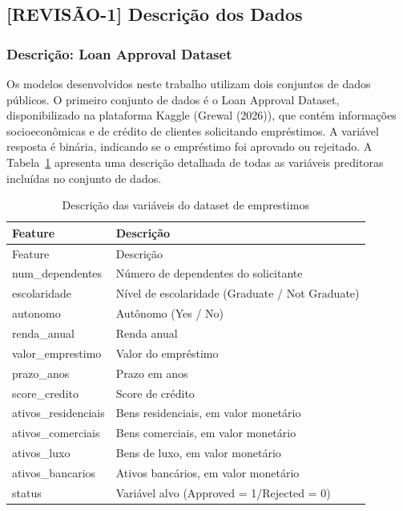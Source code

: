 \documentclass[
  brazilian,
  12pt,
  letterpaper,
  DIV=11,
  numbers=noendperiod]{scrartcl}
\begin{document}
\subsection{{[}REVISÃO-1{]} Descrição dos
Dados}\label{revisuxe3o-1-descriuxe7uxe3o-dos-dados}

\subsubsection{Descrição: Loan Approval
Dataset}\label{descriuxe7uxe3o-loan-approval-dataset}

Os modelos desenvolvidos neste trabalho utilizam dois conjuntos de dados
públicos. O primeiro conjunto de dados é o Loan Approval Dataset,
disponibilizado na plataforma Kaggle (Grewal (2026)), que contém
informações socioeconômicas e de crédito de clientes solicitando
empréstimos. A variável resposta é binária, indicando se o empréstimo
foi aprovado ou rejeitado. A Tabela~\ref{tbl-descricao-emprestimos}
apresenta uma descrição detalhada de todas as variáveis preditoras
incluídas no conjunto de dados.

\begin{longtable}[]{@{}ll@{}}
\caption{Descrição das variáveis do dataset de
emprestimos}\label{tbl-descricao-emprestimos}\tabularnewline
\toprule\noalign{}
Feature & Descrição \\
\midrule\noalign{}
\endfirsthead
\toprule\noalign{}
Feature & Descrição \\
\midrule\noalign{}
\endhead
\bottomrule\noalign{}
\endlastfoot
num\_dependentes & Número de dependentes do solicitante \\
escolaridade & Nível de escolaridade (Graduate / Not Graduate) \\
autonomo & Autônomo (Yes / No) \\
renda\_anual & Renda anual \\
valor\_emprestimo & Valor do empréstimo \\
prazo\_anos & Prazo em anos \\
score\_credito & Score de crédito \\
ativos\_residenciais & Bens residenciais, em valor monetário \\
ativos\_comerciais & Bens comerciais, em valor monetário \\
ativos\_luxo & Bens de luxo, em valor monetário \\
ativos\_bancarios & Ativos bancários, em valor monetário \\
status & Variável alvo (Approved = 1/Rejected = 0) \\
\end{longtable}
\end{document}
